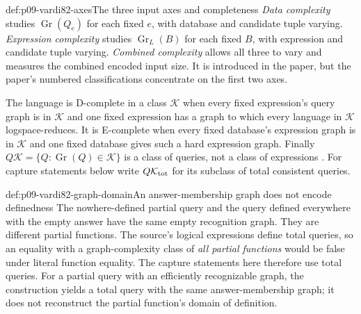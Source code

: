 \begin{hbdefinition}{def:p09-vardi82-axes}{The three input axes and completeness}
\emph{Data complexity} studies \(\operatorname{Gr}(Q_e)\) for each fixed
\(e\), with database and candidate tuple varying.
\emph{Expression complexity} studies \(\operatorname{Gr}_L(B)\) for each
fixed \(B\), with expression and candidate tuple varying.
\emph{Combined complexity} allows all three to vary and measures the
combined encoded input size.  It is introduced in the paper, but the paper's
numbered classifications concentrate on the first two axes.

The language is D-complete in a class \(\mathcal K\) when every fixed
expression's query graph is in \(\mathcal K\) and one fixed expression
has a graph to which every language in \(\mathcal K\) logspace-reduces.
It is E-complete when every fixed database's expression graph is in
\(\mathcal K\) and one fixed database gives such a hard expression graph.
Finally
\(Q\mathcal K=\{Q:\operatorname{Gr}(Q)\in\mathcal K\}\)
is a class of queries, not a class of expressions
\cite[pp.~137, 139]{Vardi1982}.
For capture statements below write \(Q\mathcal K_{\rm tot}\) for its
subclass of total consistent queries.
\end{hbdefinition}

\begin{hbwarning}{def:p09-vardi82-graph-domain}{An answer-membership graph does not encode definedness}
The nowhere-defined partial query and the query defined everywhere with the
empty answer have the same empty recognition graph.  They are different
partial functions.  The source's logical expressions define total queries,
so an equality with a graph-complexity class of \emph{all partial functions}
would be false under literal function equality.  The capture statements here
therefore use total queries.  For a partial query with an efficiently
recognizable graph, the construction yields a total query with the same
answer-membership graph; it does not reconstruct the partial function's
domain of definition.
\end{hbwarning}

